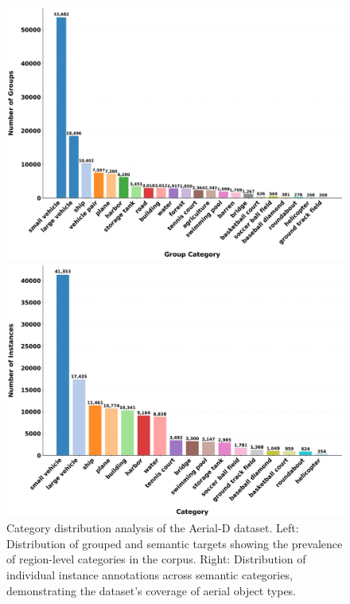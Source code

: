 \begin{figure}[t]
\centering
\begin{minipage}{0.48\textwidth}
\centering
\includegraphics[width=\textwidth]{./images/group_category_distribution.png}
\end{minipage}\hfill
\begin{minipage}{0.48\textwidth}
\centering
\includegraphics[width=\textwidth]{./images/instance_category_distribution.png}
\end{minipage}
\caption{Category distribution analysis of the Aerial-D dataset. Left: Distribution of grouped and semantic targets showing the prevalence of region-level categories in the corpus. Right: Distribution of individual instance annotations across semantic categories, demonstrating the dataset's coverage of aerial object types.}
\label{fig:category_distributions}
\end{figure}


